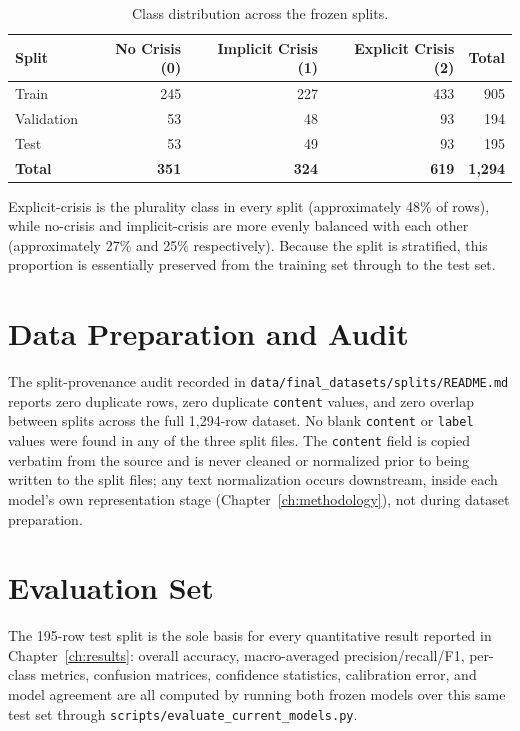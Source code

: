 \begin{table}[H]
\centering
\caption{Class distribution across the frozen splits.}
\label{tab:class-dist}
\begin{tabular}{lrrrr}
\toprule
\textbf{Split} & \textbf{No Crisis (0)} & \textbf{Implicit Crisis (1)} & \textbf{Explicit Crisis (2)} & \textbf{Total} \\
\midrule
Train      & 245 & 227 & 433 & 905 \\
Validation & 53  & 48  & 93  & 194 \\
Test       & 53  & 49  & 93  & 195 \\
\midrule
\textbf{Total} & \textbf{351} & \textbf{324} & \textbf{619} & \textbf{1{,}294} \\
\bottomrule
\end{tabular}
\end{table}

Explicit-crisis is the plurality class in every split (approximately 48\% of rows), while no-crisis and implicit-crisis are more evenly balanced with each other (approximately 27\% and 25\% respectively). Because the split is stratified, this proportion is essentially preserved from the training set through to the test set.

\section{Data Preparation and Audit}

The split-provenance audit recorded in \texttt{data/\pbrk final\_\pbrk datasets/\pbrk splits/\pbrk README.md} reports zero duplicate rows, zero duplicate \texttt{content} values, and zero overlap between splits across the full 1{,}294-row dataset. No blank \texttt{content} or \texttt{label} values were found in any of the three split files. The \texttt{content} field is copied verbatim from the source and is never cleaned or normalized prior to being written to the split files; any text normalization occurs downstream, inside each model's own representation stage (Chapter~\ref{ch:methodology}), not during dataset preparation.

\section{Evaluation Set}

The 195-row test split is the sole basis for every quantitative result reported in Chapter~\ref{ch:results}: overall accuracy, macro-averaged precision/recall/F1, per-class metrics, confusion matrices, confidence statistics, calibration error, and model agreement are all computed by running both frozen models over this same test set through \texttt{scripts/\pbrk evaluate\_\pbrk current\_\pbrk models.py}.

